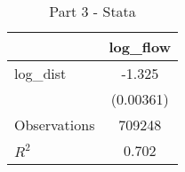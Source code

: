 \begin{table}[htbp]\centering
\caption{Part 3 - Stata}
\begin{tabular}{l*{1}{c}}
\hline\hline
                    &\multicolumn{1}{c}{log\_flow}\\
\hline
log\_dist            &      -1.325\\
                    &   (0.00361)\\
\hline
Observations        &      709248\\
\(R^{2}\)           &       0.702\\
\hline\hline
\end{tabular}
\end{table}
